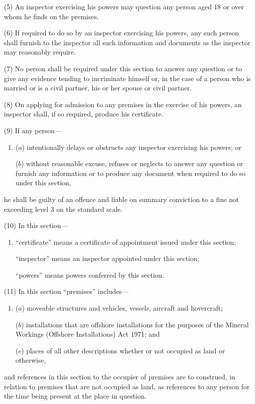 \documentclass[a4paper]{article}
\begin{document}
(5)
An inspector exercising his powers may question any person aged 18 or over whom he finds on the premises.

(6)
If required to do so by an inspector exercising his powers, any such person shall furnish to the inspector all such information and documents as the inspector may reasonably require.

(7)
No person shall be required under this section to answer any question or to give any evidence tending to incriminate himself or, in the case of a person who is married or is a civil partner, his or her spouse or civil partner.

(8)
On applying for admission to any premises in the exercise of his powers, an inspector shall, if so required, produce his certificate.

(9)
If any person---
\begin{enumerate}\item[]
($a$)
intentionally delays or obstructs any inspector exercising his powers; or

($b$)
without reasonable excuse, refuses or neglects to answer any question or furnish any information or to produce any document when required to do so under this section,
\end{enumerate}
he shall be guilty of an offence and liable on summary conviction to a fine not exceeding level 3 on the standard scale.

(10) In this section---
\begin{enumerate}\item[]
 “certificate” means a certificate of appointment issued under this section; 

“inspector” means an inspector appointed under this section; 

“powers” means powers conferred by this section.
\end{enumerate}

(11) In this section “premises” includes---
\begin{enumerate}\item[]
($a$)
moveable structures and vehicles, vessels, aircraft and hovercraft;

($b$)
installations that are offshore installations for the purposes of the Mineral Workings (Offshore Installations) Act 1971; and

($c$)
places of all other descriptions whether or not occupied as land or otherwise,
\end{enumerate}
and references in this section to the occupier of premises are to construed, in relation to premises that are not occupied as land, as references to any person for the time being present at the place in question.
\end{document}
